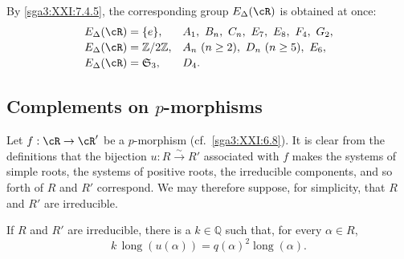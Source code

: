 \begin{remark}
\begin{center}


\end{center}
By \ref{sga3:XXI:7.4.5}, the corresponding group
\(E_\Delta(\cR)\) is obtained at once:
\[
\begin{array}{ll}
E_\Delta(\cR)=\{e\},
 & A_1,\ B_n,\ C_n,\ E_7,\ E_8,\ F_4,\ G_2,\\[2pt]
E_\Delta(\cR)=\mathbb Z/2\mathbb Z,
 & A_n\ (n\geq2),\ D_n\ (n\geq5),\ E_6,\\[2pt]
E_\Delta(\cR)=\mathfrak S_3,
 & D_4.
\end{array}
\]
\end{remark}


\subsection{Complements on \(p\)-morphisms}\label{sga3:XXI:7.5}

Let \(f:\cR\to\cR'\) be a \(p\)-morphism
(cf.\ \ref{sga3:XXI:6.8}).  It is clear from the definitions that
the bijection \(u:R\xrightarrow{\sim}R'\) associated with \(f\)
makes the systems of simple roots, the systems of positive roots,
the irreducible components, and so forth of \(R\) and \(R'\)
correspond.  We may therefore suppose, for simplicity, that
\(R\) and \(R'\) are irreducible.

\begin{lemma}\label{sga3:XXI:7.5.1}
If \(R\) and \(R'\) are irreducible, there is a \(k\in\mathbb Q\)
such that, for every \(\alpha\in R\),
\[
 k\,\operatorname{long}(u(\alpha))
 =
 q(\alpha)^2\operatorname{long}(\alpha).
\]
\end{lemma}

